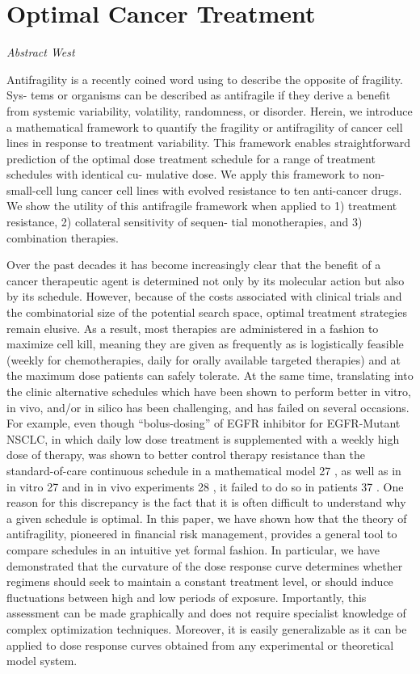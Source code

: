 \documentclass[
]{book}
\begin{document}
\hypertarget{optimal-cancer-treatment}{%
\section{Optimal Cancer Treatment}\label{optimal-cancer-treatment}}

\emph{Abstract West}

Antifragility is a recently coined word using to describe the opposite of fragility. Sys-
tems or organisms can be described as antifragile if they derive a benefit from systemic
variability, volatility, randomness, or disorder. Herein, we introduce a mathematical
framework to quantify the fragility or antifragility of cancer cell lines in response
to treatment variability. This framework enables straightforward prediction of the
optimal dose treatment schedule for a range of treatment schedules with identical cu-
mulative dose. We apply this framework to non-small-cell lung cancer cell lines with
evolved resistance to ten anti-cancer drugs. We show the utility of this antifragile
framework when applied to 1) treatment resistance, 2) collateral sensitivity of sequen-
tial monotherapies, and 3) combination therapies.

Over the past decades it has become increasingly clear that the benefit of a cancer therapeutic
agent is determined not only by its molecular action but also by its schedule. However,
because of the costs associated with clinical trials and the combinatorial size of the potential
search space, optimal treatment strategies remain elusive. As a result, most therapies are
administered in a fashion to maximize cell kill, meaning they are given as frequently as is
logistically feasible (weekly for chemotherapies, daily for orally available targeted therapies)
and at the maximum dose patients can safely tolerate. At the same time, translating into
the clinic alternative schedules which have been shown to perform better in vitro, in vivo,
and/or in silico has been challenging, and has failed on several occasions. For example, even
though ``bolus-dosing'' of EGFR inhibitor for EGFR-Mutant NSCLC, in which daily low
dose treatment is supplemented with a weekly high dose of therapy, was shown to better
control therapy resistance than the standard-of-care continuous schedule in a mathematical
model 27 , as well as in in vitro 27 and in in vivo experiments 28 , it failed to do so in patients 37 .
One reason for this discrepancy is the fact that it is often difficult to understand why a
given schedule is optimal. In this paper, we have shown how that the theory of antifragility,
pioneered in financial risk management, provides a general tool to compare schedules in an
intuitive yet formal fashion. In particular, we have demonstrated that the curvature of the dose
response curve determines whether regimens should seek to maintain a constant treatment
level, or should induce fluctuations between high and low periods of exposure. Importantly,
this assessment can be made graphically and does not require specialist knowledge of
complex optimization techniques. Moreover, it is easily generalizable as it can be applied to
dose response curves obtained from any experimental or theoretical model system.
\end{document}
